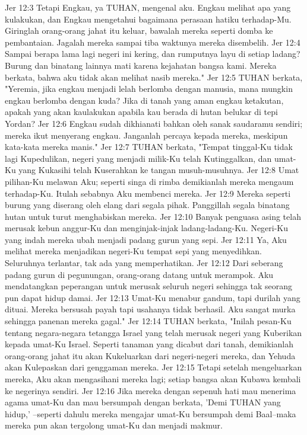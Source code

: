 Jer 12:3  Tetapi Engkau, ya TUHAN, mengenal aku. Engkau melihat apa yang kulakukan, dan Engkau mengetahui bagaimana perasaan hatiku terhadap-Mu. Giringlah orang-orang jahat itu keluar, bawalah mereka seperti domba ke pembantaian. Jagalah mereka sampai tiba waktunya mereka disembelih.
Jer 12:4  Sampai berapa lama lagi negeri ini kering, dan rumputnya layu di setiap ladang? Burung dan binatang lainnya mati karena kejahatan bangsa kami. Mereka berkata, bahwa aku tidak akan melihat nasib mereka."
Jer 12:5  TUHAN berkata, "Yeremia, jika engkau menjadi lelah berlomba dengan manusia, mana mungkin engkau berlomba dengan kuda? Jika di tanah yang aman engkau ketakutan, apakah yang akan kaulakukan apabila kau berada di hutan belukar di tepi Yordan?
Jer 12:6  Engkau sudah dikhianati bahkan oleh sanak saudaramu sendiri; mereka ikut menyerang engkau. Janganlah percaya kepada mereka, meskipun kata-kata mereka manis."
Jer 12:7  TUHAN berkata, "Tempat tinggal-Ku tidak lagi Kupedulikan, negeri yang menjadi milik-Ku telah Kutinggalkan, dan umat-Ku yang Kukasihi telah Kuserahkan ke tangan musuh-musuhnya.
Jer 12:8  Umat pilihan-Ku melawan Aku; seperti singa di rimba demikianlah mereka mengaum terhadap-Ku. Itulah sebabnya Aku membenci mereka.
Jer 12:9  Mereka seperti burung yang diserang oleh elang dari segala pihak. Panggillah segala binatang hutan untuk turut menghabiskan mereka.
Jer 12:10  Banyak penguasa asing telah merusak kebun anggur-Ku dan menginjak-injak ladang-ladang-Ku. Negeri-Ku yang indah mereka ubah menjadi padang gurun yang sepi.
Jer 12:11  Ya, Aku melihat mereka menjadikan negeri-Ku tempat sepi yang menyedihkan. Seluruhnya terlantar, tak ada yang memperhatikan.
Jer 12:12  Dari seberang padang gurun di pegunungan, orang-orang datang untuk merampok. Aku mendatangkan peperangan untuk merusak seluruh negeri sehingga tak seorang pun dapat hidup damai.
Jer 12:13  Umat-Ku menabur gandum, tapi durilah yang dituai. Mereka bersusah payah tapi usahanya tidak berhasil. Aku sangat murka sehingga panenan mereka gagal."
Jer 12:14  TUHAN berkata, "Inilah pesan-Ku tentang negara-negara tetangga Israel yang telah merusak negeri yang Kuberikan kepada umat-Ku Israel. Seperti tanaman yang dicabut dari tanah, demikianlah orang-orang jahat itu akan Kukeluarkan dari negeri-negeri mereka, dan Yehuda akan Kulepaskan dari genggaman mereka.
Jer 12:15  Tetapi setelah mengeluarkan mereka, Aku akan mengasihani mereka lagi; setiap bangsa akan Kubawa kembali ke negerinya sendiri.
Jer 12:16  Jika mereka dengan sepenuh hati mau menerima agama umat-Ku dan mau bersumpah dengan berkata, 'Demi TUHAN yang hidup,' --seperti dahulu mereka mengajar umat-Ku bersumpah demi Baal--maka mereka pun akan tergolong umat-Ku dan menjadi makmur.
